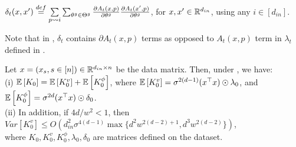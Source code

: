 \begin{definition}\label{def:delta}
$\delta_t(x,x')\stackrel{def}= \underset{{p\rightsquigarrow i}}{\sum} \sum_{\theta^g\in{\Theta}^g}\frac{\partial A_{t}(x,p)}{\partial \theta^g} \frac{\partial A_{t}(x',p)}{\partial \theta^g}$, for $x,x'\in\mathbb{R}^{d_{in}}$, using any $i\in[d_{in}]$.
\end{definition}
Note that in , $\delta_t$ contains $\partial A_t(x,p)$ terms as opposed to $A_t(x,p)$ term in $\lambda_t$ defined in .
\begin{theorem}\label{th:main} Let $x=(x_s,s\in[n])\in \mathbb{R}^{d_{in}\times n}$ be the data matrix. Then, under , we have:\\
(i) $\mathbb{E}\left[K_0\right]=\mathbb{E}\left[K^v_0\right]+\mathbb{E}\left[K^{\phi}_0\right]$, where $\mathbb{E}\left[K^{v}_0\right]=\sigma^{2(d-1)} (x^\top x)\odot \lambda_0$, and $\mathbb{E}\left[K^{\phi}_0\right]=\sigma^{2d}  (x^\top x)\odot \delta_0$.\\
(ii) In addition, if ${4d}/{w^2}<1$, then $Var\left[K^v_0\right]\leq O\left(d^2_{in}\sigma^{4(d-1)}\max\{d^2w^{2(d-2)+1}, d^3w^{2(d-2)}\}\right)$,\\
where $K_0, K^v_0, K^{\phi}_0, \lambda_0, \delta_0$ are matrices defined on the dataset.
\end{theorem}


